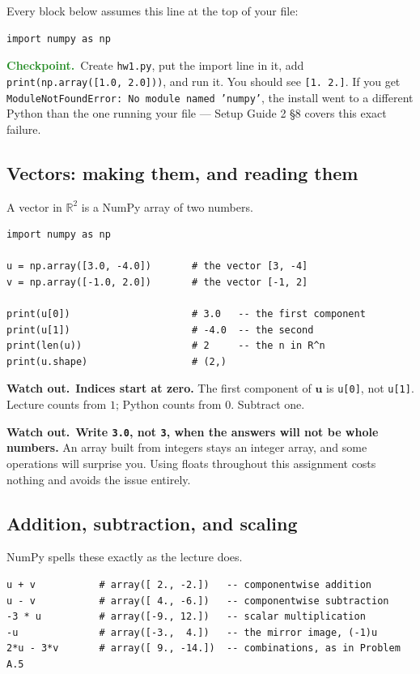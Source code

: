 \documentclass[11pt]{article}
\theoremstyle{definition}
\newcommand{\heads}[1]{\par\smallskip\noindent
  {\small\sffamily\textcolor{BrickRed}{\textbf{Watch out.}}\ #1}\par\smallskip}
\newcommand{\checkpoint}[1]{\par\smallskip\noindent
  {\small\sffamily\textcolor{ForestGreen}{\textbf{Checkpoint.}}\ #1}\par\smallskip}
\newcommand{\R}{\mathbb{R}}
\newcommand{\vc}[1]{\mathbf{#1}}
\begin{document}
\noindent Every block below assumes this line at the top of your file:

\begin{lstlisting}
import numpy as np
\end{lstlisting}

\checkpoint{Create \texttt{hw1.py}, put the import line in it, add
\texttt{print(np.array([1.0, 2.0]))}, and run it. You should see
\texttt{[1. 2.]}. If you get \texttt{ModuleNotFoundError: No module named
'numpy'}, the install went to a different Python than the one running your file
--- Setup Guide 2 \S8 covers this exact failure.}

\subsection{Vectors: making them, and reading them}

A vector in $\R^{2}$ is a NumPy array of two numbers.

\begin{lstlisting}
import numpy as np

u = np.array([3.0, -4.0])       # the vector [3, -4]
v = np.array([-1.0, 2.0])       # the vector [-1, 2]

print(u[0])                     # 3.0   -- the first component
print(u[1])                     # -4.0  -- the second
print(len(u))                   # 2     -- the n in R^n
print(u.shape)                  # (2,)
\end{lstlisting}

\heads{\textbf{Indices start at zero.} The first component of $\vc{u}$ is
\texttt{u[0]}, not \texttt{u[1]}. Lecture counts from $1$; Python counts from
$0$. Subtract one.}

\heads{\textbf{Write \texttt{3.0}, not \texttt{3}, when the answers will not be
whole numbers.} An array built from integers stays an integer array, and some
operations will surprise you. Using floats throughout this assignment costs
nothing and avoids the issue entirely.}

\subsection{Addition, subtraction, and scaling}

NumPy spells these exactly as the lecture does.

\begin{lstlisting}
u + v           # array([ 2., -2.])   -- componentwise addition
u - v           # array([ 4., -6.])   -- componentwise subtraction
-3 * u          # array([-9., 12.])   -- scalar multiplication
-u              # array([-3.,  4.])   -- the mirror image, (-1)u
2*u - 3*v       # array([ 9., -14.])  -- combinations, as in Problem A.5
\end{lstlisting}
\end{document}
